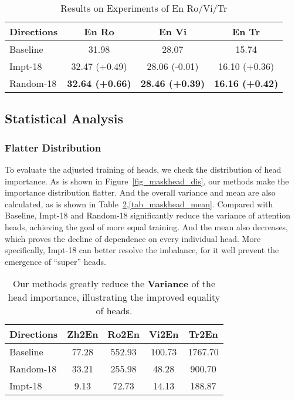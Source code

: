 \documentclass[11pt]{article}
\begin{document}
\begin{table}[h]\footnotesize
    \centering
    \begin{tabular}{lccc}
        \hline
        Directions & En  Ro & En  Vi & En  Tr \\ \hline
        Baseline & 31.98 & 28.07 & 15.74 \\
Impt-18 & 32.47 (+0.49) & 28.06 (-0.01) & 16.10 (+0.36) \\
        Random-18 & \textbf{32.64 (+0.66)} & \textbf{28.46 (+0.39)} & \textbf{16.16 (+0.42)} \\ \hline
\end{tabular}
    \caption{Results on Experiments of En  Ro/Vi/Tr}
    \label{tab_trans_en2x}
\end{table}



\subsection{Statistical Analysis} 

\subsubsection{Flatter Distribution} 

To evaluate the adjusted training of heads, we check the distribution of head importance. As is shown in Figure~\ref{fig_maskhead_dis}, our methods make the importance distribution flatter. And the overall variance and mean are also calculated, as is shown in Table~\ref{tab_maskhead_var},\ref{tab_maskhead_mean}. Compared with Baseline, Impt-18 and Random-18 significantly reduce the variance of attention heads, achieving the goal of more equal training. And the mean also decreases, which proves the decline of dependence on every individual head. More specifically, Impt-18 can better resolve the imbalance, for it well prevent the emergence of ``super'' heads.





\begin{table}[h]\footnotesize
    \centering
    \begin{tabular}{lcccc}
        \hline
        Directions & Zh2En & Ro2En & Vi2En & Tr2En\\ \hline
        Baseline & 77.28 & 552.93 & 100.73 & 1767.70 \\
        Random-18 & 33.21 & 255.98 & 48.28 & 900.70  \\
        Impt-18 & 9.13 & 72.73 & 14.13 & 188.87  \\ \hline
    \end{tabular}
    \caption{Our methods greatly reduce the \textbf{Variance} of the head importance, illustrating the improved equality of heads.}
    \label{tab_maskhead_var}
\end{table}
\end{document}
